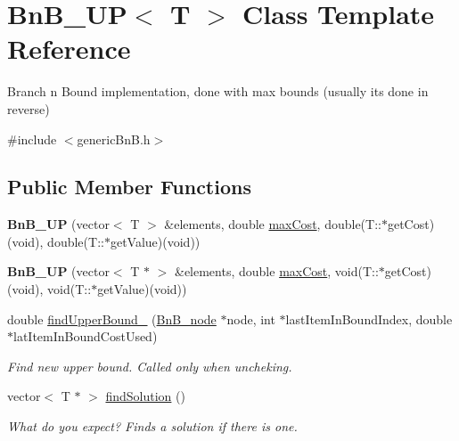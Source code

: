 \hypertarget{class_bn_b___u_p}{}\section{Bn\+B\+\_\+\+U\+P$<$ T $>$ Class Template Reference}
\label{class_bn_b___u_p}


Branch n Bound implementation, done with max bounds (usually it\textquotesingle{}s done in reverse)  




{\ttfamily \#include $<$generic\+Bn\+B.\+h$>$}

\subsection*{Public Member Functions}
\begin{DoxyCompactItemize}
\item 
\hypertarget{class_bn_b___u_p_a1906f95c4d3eb96568d6f314e2878808}{}{\bfseries Bn\+B\+\_\+\+U\+P} (vector$<$ T $>$ \&elements, double \hyperlink{class_bn_b___u_p_a0749a907c11c880f825fd0644a8a2bfd}{max\+Cost}, double(T\+::$\ast$get\+Cost)(void), double(T\+::$\ast$get\+Value)(void))\label{class_bn_b___u_p_a1906f95c4d3eb96568d6f314e2878808}

\item 
\hypertarget{class_bn_b___u_p_ae26455243268d49878421014d4bc1645}{}{\bfseries Bn\+B\+\_\+\+U\+P} (vector$<$ T $\ast$ $>$ \&elements, double \hyperlink{class_bn_b___u_p_a0749a907c11c880f825fd0644a8a2bfd}{max\+Cost}, void(T\+::$\ast$get\+Cost)(void), void(T\+::$\ast$get\+Value)(void))\label{class_bn_b___u_p_ae26455243268d49878421014d4bc1645}

\item 
double \hyperlink{class_bn_b___u_p_a52efbfa978fd9b6c43e50da878862d93}{find\+Upper\+Bound\+\_} (\hyperlink{class_bn_b__node}{Bn\+B\+\_\+node} $\ast$node, int $\ast$last\+Item\+In\+Bound\+Index, double $\ast$lat\+Item\+In\+Bound\+Cost\+Used)
\begin{DoxyCompactList}\small\item\em Find new upper bound. Called only when uncheking. \end{DoxyCompactList}\item 
vector$<$ T $\ast$ $>$ \hyperlink{class_bn_b___u_p_a18f7b192ac90dcf610c850f7ab10e365}{find\+Solution} ()
\begin{DoxyCompactList}\small\item\em What do you expect? Finds a solution if there is one. \end{DoxyCompactList}\end{DoxyCompactItemize}
